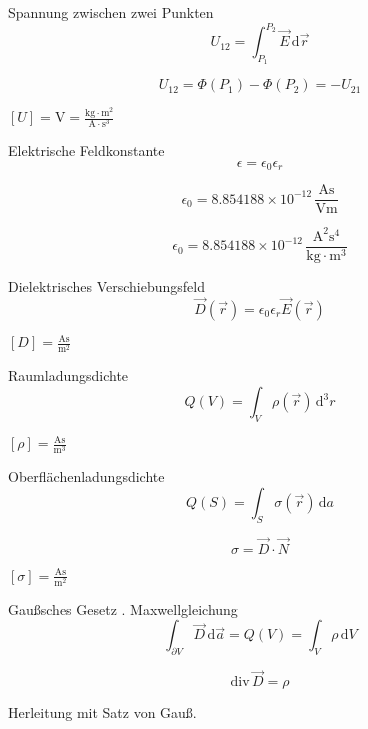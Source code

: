 \documentclass[a7paper]{kartei}
\begin{document}
\begin{karte}[Elektrostatik]{Spannung zwischen zwei Punkten}
\[
U_{12} = \int_{P_1}^{P_2} \vec{E} \, \mathrm{d}\vec{r}
\]

\[
U_{12} = \Phi(P_1) - \Phi(P_2) = -U_{21}
\]

\([U] = \text{V} = \frac{\text{kg} \cdot \text{m}^2}{\text{A} \cdot \text{s}^3}\)
\end{karte}

\begin{karte}[Elektrostatik]{Elektrische Feldkonstante}
\[
\epsilon = \epsilon_0 \epsilon_r
\]

\[
\epsilon_0 = 8.854188 \times 10^{-12} \, \frac{\text{As}}{\text{Vm}}
\]

\[
\epsilon_0 = 8.854188 \times 10^{-12} \, \frac{\text{A}^2\text{s}^4}{\text{kg} \cdot \text{m}^3}
\]
\end{karte}

\begin{karte}[Elektrostatik]{Dielektrisches Verschiebungsfeld}
\[
\vec{D}(\vec{r}) = \epsilon_0 \epsilon_r \vec{E}(\vec{r})
\]

\([D] = \frac{\text{As}}{\text{m}^2}\)
\end{karte}

\begin{karte}[Elektrostatik]{Raumladungsdichte}
\[
Q(V) = \int_V \rho(\vec{r}) \, \mathrm{d}^3r
\]

\([\rho] = \frac{\text{As}}{\text{m}^3}\)
\end{karte}

\begin{karte}[Elektrostatik]{Oberflächenladungsdichte}
\[
Q(S) = \int_S \sigma(\vec{r}) \, \mathrm{d}a
\]

\[
\sigma = \vec{D} \cdot \vec{N}
\]

\([\sigma] = \frac{\text{As}}{\text{m}^2}\)
\end{karte}

\begin{karte}[Elektrostatik]{Gaußsches Gesetz}
. Maxwellgleichung
\\
\[
\int_{\partial V} \vec{D} \, \mathrm{d}\vec{a} = Q(V) = \int_{V} \rho \, \mathrm{d}V
\]

\[
\text{div} \, \vec{D} = \rho
\]

Herleitung mit Satz von Gauß.
\end{karte}
\end{document}
